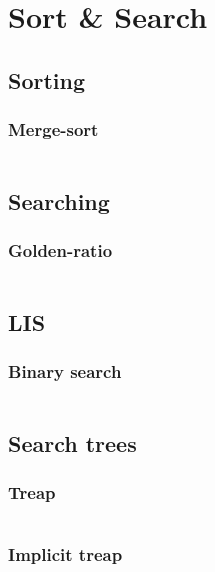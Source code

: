 \section{Sort \& Search}

\subsection{Sorting}
\subsubsection{Merge-sort}
\inputminted{cpp}{../code/sort/merge_sort.cpp}


\subsection{Searching}
\subsubsection{Golden-ratio}
\inputminted{cpp}{../code/sort/golden_ratio.cpp}

\subsection{LIS}
\subsubsection{Binary search}
\inputminted{cpp}{../code/sort/LIS/binary_search.cpp}

\subsection{Search trees}
\subsubsection{Treap}
\inputminted{cpp}{../code/sort/tree/treap.cpp}
\subsubsection{Implicit treap}
\inputminted{cpp}{../code/sort/tree/implicit.cpp}
